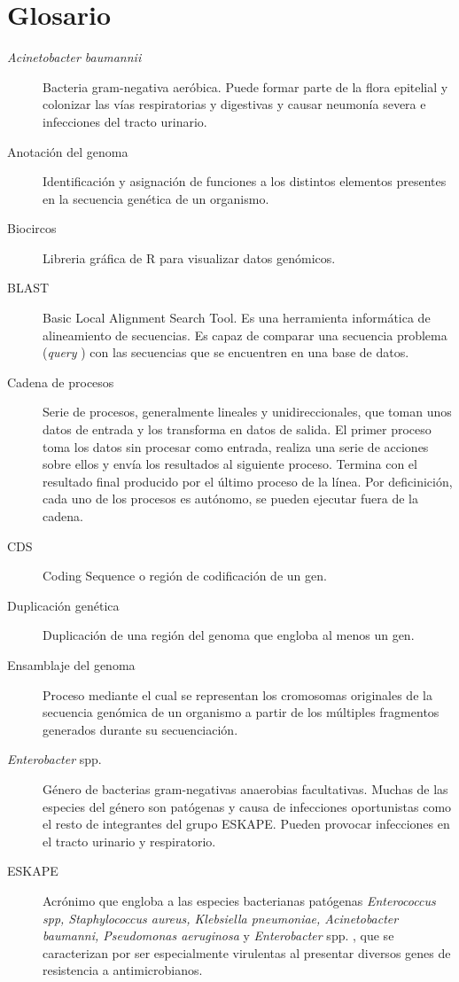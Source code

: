 \pagestyle{plain}

\chapter*{Glosario}

\begin{description}

\item[\textit{Acinetobacter baumannii}] Bacteria gram-negativa aeróbica. Puede formar parte de la flora epitelial y colonizar las vías respiratorias y digestivas y causar neumonía severa e infecciones del tracto urinario.
\item[Anotación del genoma] Identificación y asignación de funciones a los distintos elementos presentes en la secuencia genética de un organismo.
\item[Biocircos] Libreria gráfica de R para visualizar datos genómicos.
\item[BLAST] Basic Local Alignment Search Tool. Es una herramienta informática de alineamiento de secuencias. Es capaz de comparar una secuencia problema (\textit{query} ) con las secuencias que se encuentren en una base de datos.
\item[Cadena de procesos] Serie de procesos, generalmente lineales y unidireccionales, que toman unos datos de entrada y los transforma en datos de salida. El primer proceso toma los datos sin procesar como entrada, realiza una serie de acciones sobre ellos y envía los resultados al siguiente proceso. Termina con el resultado final producido por el último proceso de la línea. Por deficinición, cada uno de los procesos es autónomo, se pueden ejecutar fuera de la cadena.
\item[CDS] Coding Sequence o región de codificación de un gen.
\item[Duplicación genética] Duplicación de una región del genoma que engloba al menos un gen.
\item[Ensamblaje del genoma] Proceso mediante el cual se representan los cromosomas originales de la secuencia genómica de un organismo a partir de los múltiples fragmentos generados durante su secuenciación.
\item[\textit{Enterobacter}  spp.] Género de bacterias gram-negativas anaerobias facultativas. Muchas de las especies del género son patógenas y causa de infecciones oportunistas como el resto de integrantes del grupo ESKAPE. Pueden provocar infecciones en el tracto urinario y respiratorio.
\item[ESKAPE] Acrónimo que engloba a las especies bacterianas patógenas \textit{Enterococcus spp, Staphylococcus aureus, Klebsiella pneumoniae, Acinetobacter baumanni, Pseudomonas aeruginosa} y \textit{Enterobacter} spp. , que se caracterizan por ser especialmente virulentas al presentar diversos genes de resistencia a antimicrobianos.

\end{description}
